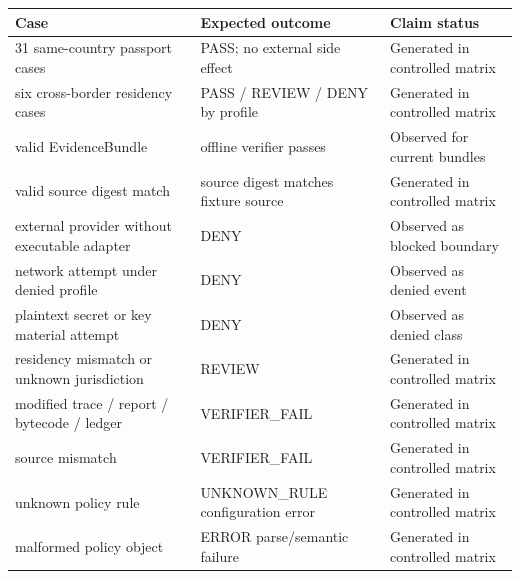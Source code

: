 \begin{tabularx}{\linewidth}{@{}XXX@{}}
\toprule
Case & Expected outcome & Claim status \\
\midrule
31 same-country passport cases & PASS; no external side effect & Generated in controlled matrix \\
six cross-border residency cases & PASS / REVIEW / DENY by profile & Generated in controlled matrix \\
valid EvidenceBundle & offline verifier passes & Observed for current bundles \\
valid source digest match & source digest matches fixture source & Generated in controlled matrix \\
external provider without executable adapter & DENY & Observed as blocked boundary \\
network attempt under denied profile & DENY & Observed as denied event \\
plaintext secret or key material attempt & DENY & Observed as denied class \\
residency mismatch or unknown jurisdiction & REVIEW & Generated in controlled matrix \\
modified trace / report / bytecode / ledger & VERIFIER\_FAIL & Generated in controlled matrix \\
source mismatch & VERIFIER\_FAIL & Generated in controlled matrix \\
unknown policy rule & UNKNOWN\_RULE configuration error & Generated in controlled matrix \\
malformed policy object & ERROR parse/semantic failure & Generated in controlled matrix \\
\bottomrule
\end{tabularx}
